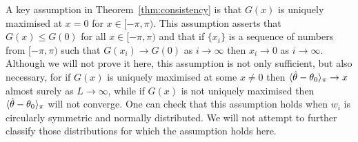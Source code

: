 \documentclass[draftcls, onecolumn, 11pt]{IEEEtran}
\begin{document}

A key assumption in Theorem~\ref{thm:consistency} is that $G(x)$ is uniquely maximised at $x = 0$ for $x \in [-\pi, \pi)$.  This assumption asserts that $G(x) \leq G(0)$ for all $x \in [-\pi, \pi)$ and that if $\{x_i\}$ is a sequence of numbers from $[-\pi,\pi)$ such that $G(x_i) \rightarrow G(0)$ as $i \rightarrow \infty$ then $x_i \rightarrow 0$ as $i \rightarrow \infty$.  Although we will not prove it here, this assumption is not only sufficient, but also necessary, for if $G(x)$ is uniquely maximised at some $x \neq 0$ then $\langle \hat{\theta} - \theta_0 \rangle_\pi \rightarrow x$ almost surely as $L\rightarrow\infty$, while if $G(x)$ is not uniquely maximised then $\langle \hat{\theta} - \theta_0 \rangle_\pi$ will not converge.  One can check that this assumption holds when $w_i$ is circularly symmetric and normally distributed.  We will not attempt to further classify those distributions for which the assumption holds here.


\end{document}
